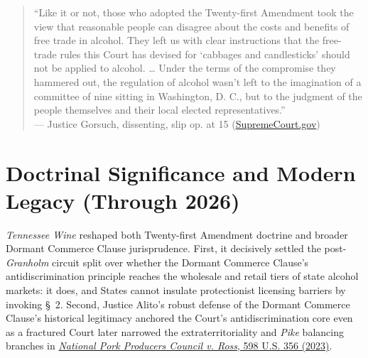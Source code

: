\documentclass[12pt]{article}
\begin{document}
\begin{quote}
``Like it or not, those who adopted the Twenty-first Amendment took the view that reasonable people can disagree about the costs and benefits of free trade in alcohol. They left us with clear instructions that the free-trade rules this Court has devised for `cabbages and candlesticks' should not be applied to alcohol. \ldots{} Under the terms of the compromise they hammered out, the regulation of alcohol wasn't left to the imagination of a committee of nine sitting in Washington, D. C., but to the judgment of the people themselves and their local elected representatives.'' \\
--- Justice Gorsuch, dissenting, slip op. at 15 (\href{https://www.supremecourt.gov/opinions/18pdf/18-96_5i36.pdf}{SupremeCourt.gov})
\end{quote}

\section{Doctrinal Significance and Modern Legacy (Through 2026)}

\textit{Tennessee Wine} reshaped both Twenty-first Amendment doctrine and broader Dormant Commerce Clause jurisprudence. First, it decisively settled the post-\textit{Granholm} circuit split over whether the Dormant Commerce Clause's antidiscrimination principle reaches the wholesale and retail tiers of state alcohol markets: it does, and States cannot insulate protectionist licensing barriers by invoking \S~2. Second, Justice Alito's robust defense of the Dormant Commerce Clause's historical legitimacy anchored the Court's antidiscrimination core even as a fractured Court later narrowed the extraterritoriality and \textit{Pike} balancing branches in \href{https://supreme.justia.com/cases/federal/us/598/21-468/}{\textit{National Pork Producers Council v. Ross}, 598 U.S. 356 (2023)}.
\end{document}
